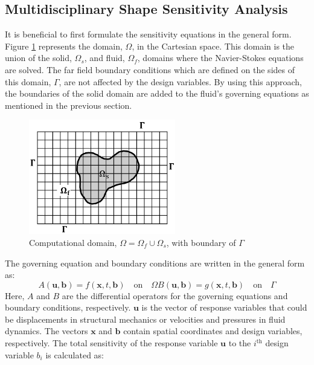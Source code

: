 \documentclass[12pt]{aiaa-pretty}
\begin{document}
\subsection{Multidisciplinary Shape Sensitivity Analysis}\label{sec:SA}
It is beneficial to first formulate the sensitivity equations in the general form. Figure \ref{fig:domain} represents the domain, $\Omega$, in the Cartesian space. This domain is the union of the solid, $\Omega_s$, and fluid, $\Omega_f$, domains where the Navier-Stokes equations are solved. The far field boundary conditions which are defined on the sides of this domain, $\Gamma$, are not affected by the design variables. By using this approach, the boundaries of the solid domain are added to the fluid's governing equations as mentioned in the previous section.
%
\begin{figure}[H]
	\centering
	\includegraphics[height=5.0cm]{figure/domain.jpg}
	\caption{Computational domain, $\Omega = \Omega_f \cup \Omega_s$, with boundary of $\Gamma$}
	\label{fig:domain}
\end{figure}
%
The governing equation and boundary conditions are written in the general form as:
%
\begin{subequations}\label{eq:generalFormForGE}
\begin{equation}
	A(\mathbf{u}, \mathbf{b}) = f(\mathbf{x}, t, \mathbf{b}) \quad \text{on} \quad \Omega
\end{equation}
\begin{equation}
	B(\mathbf{u}, \mathbf{b}) = g(\mathbf{x}, t, \mathbf{b}) \quad \text{on} \quad \Gamma
\end{equation}
\end{subequations}
%
Here, $A$ and $B$ are the differential operators for the governing equations and boundary conditions, respectively. $\mathbf{u}$ is the vector of response variables that could be displacements in structural mechanics or velocities and pressures in fluid dynamics. The vectors $\mathbf{x}$ and $\mathbf{b}$ contain spatial coordinates and design variables, respectively. The total sensitivity of the response variable $\mathbf{u}$ to the $i^\text{th}$ design variable $b_i$ is calculated as:
\end{document}
